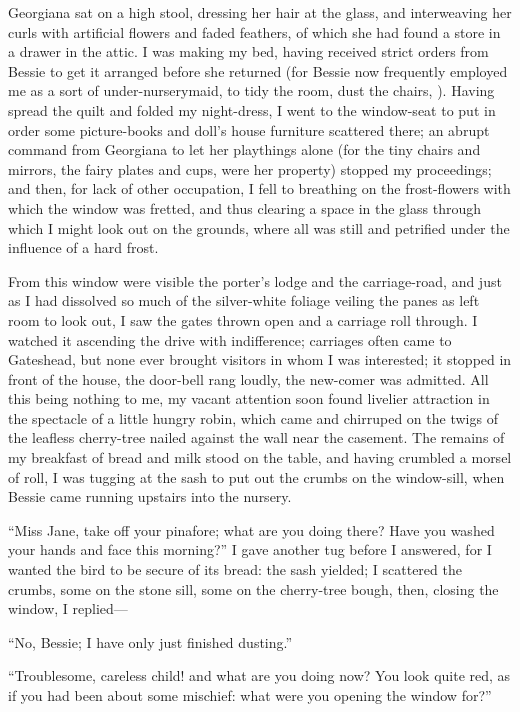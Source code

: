 Georgiana sat on a high stool, dressing her hair at the glass, and
interweaving her curls with artificial flowers and faded feathers, of
which she had found a store in a drawer in the attic. I was making my
bed, having received strict orders from Bessie to get it arranged before
she returned (for Bessie now frequently employed me as a sort of
under-nurserymaid, to tidy the room, dust the chairs, \etc). Having
spread the quilt and folded my night-dress, I went to the window-seat to
put in order some picture-books and doll's house furniture scattered
there; an abrupt command from Georgiana to let her playthings alone (for
the tiny chairs and mirrors, the fairy plates and cups, were her
property) stopped my proceedings; and then, for lack of other
occupation, I fell to breathing on the frost-flowers with which the
window was fretted, and thus clearing a space in the glass through which
I might look out on the grounds, where all was still and petrified under
the influence of a hard frost.

From this window were visible the porter's lodge and the carriage-road,
and just as I had dissolved so much of the silver-white foliage veiling
the panes as left room to look out, I saw the gates thrown open and a
carriage roll through. I watched it ascending the drive with
indifference; carriages often came to Gateshead, but none ever brought
visitors in whom I was interested; it stopped in front of the house, the
door-bell rang loudly, the new-comer was admitted. All this being
nothing to me, my vacant attention soon found livelier attraction in the
spectacle of a little hungry robin, which came and chirruped on the
twigs of the leafless cherry-tree nailed against the wall near the
casement. The remains of my breakfast of bread and milk stood on the
table, and having crumbled a morsel of roll, I was tugging at the sash
to put out the crumbs on the window-sill, when Bessie came running
upstairs into the nursery.

\enquote{Miss Jane, take off your pinafore; what are you doing there? 
Have you washed your hands and face this morning?} I gave another tug
before I answered, for I wanted the bird to be secure of its bread: the
sash yielded; I scattered the crumbs, some on the stone sill, some on
the cherry-tree bough, then, closing the window, I replied---

\enquote{No, Bessie; I have only just finished dusting.}

\enquote{Troublesome, careless child! and what are you doing now? You
look quite red, as if you had been about some mischief: what were you
opening the window for?}

